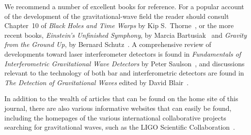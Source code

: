 We recommend a number of excellent books for reference. For a popular account of
the development of the gravitational-wave field the reader should consult
Chapter~10 of \textit{Black Holes and Time Warps} by Kip S.\ Thorne~\cite{Thorne}, or
the more recent books, \textit{Einstein's Unfinished Symphony}, by Marcia
Bartusiak~\cite{Bartusiak:2000} and \textit{Gravity from the Ground Up}, by Bernard
Schutz~\cite{Schutz:2003}. A comprehensive review of developments toward laser
interferometer detectors is found in \textit{Fundamentals of Interferometric
Gravitational Wave Detectors} by Peter Saulson~\cite{Saulsonbook}, and
discussions relevant to the technology of both bar and interferometric detectors
are found in \textit{The Detection of Gravitational Waves} edited by David
Blair~\cite{Blair}.


In addition to the wealth of articles that can be found on the home site of
this journal, there are also various informative websites that can easily be
found, including the homepages of the various international collaborative
projects searching for gravitational waves, such as the LIGO Scientific
Collaboration~\cite{LSCweb}.


  
  